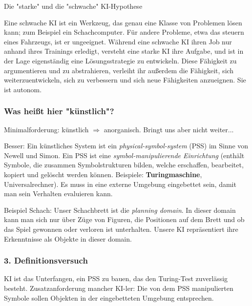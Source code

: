 \documentclass[runningheads,deutsch]{llncs}
\begin{document}
\begin{definition}{Die "starke" und die "schwache" KI-Hypothese}

Eine schwache KI ist ein Werkzeug, das genau eine Klasse von Problemen lösen kann; zum Beispiel ein Schachcomputer. Für andere Probleme, etwa das steuern eines Fahrzeugs, ist er ungeeignet. Während eine schwache KI ihren Job nur anhand ihres Trainings erledigt, versteht eine starke KI ihre Aufgabe, und ist in der Lage eigenständig eine Lösungsstrategie zu entwickeln. Diese Fähigkeit zu argumentieren und zu abstrahieren, verleiht ihr außerdem die Fähigkeit, sich weiterzuentwickeln, sich zu verbessern und sich neue Fähigkeiten anzueignen. Sie ist autonom.

\end{definition}

\subsubsection{Was heißt hier "künstlich"?}

Minimalforderung: künstlich $\Rightarrow$ anorganisch. Bringt uns aber nicht weiter...

Besser: Ein künstliches System ist ein \textit{physical-symbol-system} (PSS) im Sinne von Newell und Simon. Ein PSS ist eine \textit{symbol-manipulierende Einrichtung} (enthält Symbole, die zusammen Symbolstrukturen bilden, welche erschaffen, bearbeitet, kopiert und gelöscht werden können. Beispiele: \textbf{Turingmaschine}, Universalrechner). Es muss in eine externe Umgebung eingebettet sein, damit man sein Verhalten evaluieren kann.

Beispiel Schach: Unser Schachbrett ist die \textit{planning domain}. In dieser domain kann man sich nur über Züge von Figuren, die Positionen auf dem Brett und ob das Spiel gewonnen oder verloren ist unterhalten. Unsere KI repräsentiert ihre Erkenntnisse als Objekte in dieser domain.


\subsubsection{3. Definitionsversuch}

KI ist das Unterfangen, ein PSS zu bauen, das den Turing-Test zuverlässig besteht.
Zusatzanforderung mancher KI-ler: Die von dem PSS manipulierten Symbole sollen Objekten in der eingebetteten Umgebung entsprechen.
\end{document}
